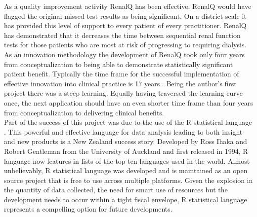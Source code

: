 \documentclass[11pt]{article}
\begin{document}
As a quality improvement activity RenalQ has been effective. RenalQ would have flagged the original missed test results as being significant. On a district scale it has provided this level of support to every patient of every practitioner. RenalQ has demonstrated that it decreases the time between sequential renal function tests for those patients who are most at risk of progressing to requiring dialysis. \\

As an innovation methodology the development of RenalQ took only four years from conceptualization to being able to demonstrate statistically significant patient benefit. Typically the time frame for the successful implementation of effective innovation into clinical practice is 17 years \citep{morris2011answer}. Being the author's first project there was a steep learning. Equally having traversed the learning curve once, the next application should have an even shorter time frame than four years from conceptualization to delivering clinical benefits. \\

Part of the success of this project was due to the use of the R statistical language \citep{rstat2013}. This powerful and effective language for data analysis leading to both insight and new products is a New Zealand success story. Developed by Ross Ihaka and Robert Gentleman from the University of Auckland and first released in 1994, R language now features in lists of the top ten languages used in the world. Almost unbelievably, R statistical language was developed and is maintained as an open source project that is free to use across multiple platforms. Given the explosion in the quantity of data collected, the need for smart use of resources but the development needs to occur within a tight fiscal envelope, R statistical language represents a compelling option for future developments. \\





\end{document}
